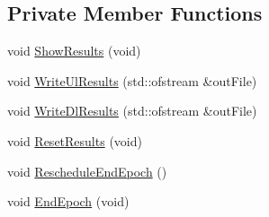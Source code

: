 \subsection*{Private Member Functions}
\begin{DoxyCompactItemize}
\item 
void \hyperlink{classns3_1_1MmWaveBearerStatsCalculator_a1b1999fe817457077fe04899b9da7d0d}{Show\+Results} (void)
\item 
void \hyperlink{classns3_1_1MmWaveBearerStatsCalculator_aa50020604d7d8bd5eeac1f91269e154d}{Write\+Ul\+Results} (std\+::ofstream \&out\+File)
\item 
void \hyperlink{classns3_1_1MmWaveBearerStatsCalculator_ac6ab69f531d63e6dd53e5b6526e80a23}{Write\+Dl\+Results} (std\+::ofstream \&out\+File)
\item 
void \hyperlink{classns3_1_1MmWaveBearerStatsCalculator_acedf4ccc48554ca542201a2a0d388f9a}{Reset\+Results} (void)
\item 
void \hyperlink{classns3_1_1MmWaveBearerStatsCalculator_a56af0e70a4988b5be09694465989c769}{Reschedule\+End\+Epoch} ()
\item 
void \hyperlink{classns3_1_1MmWaveBearerStatsCalculator_a5c4b1641a639b3d70f7207e0fe5ea1aa}{End\+Epoch} (void)
\end{DoxyCompactItemize}
